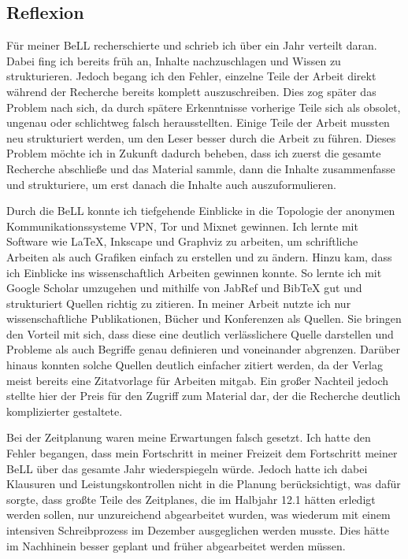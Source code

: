 \subsection{Reflexion}

Für meiner BeLL recherschierte und schrieb ich über ein Jahr verteilt daran. Dabei fing ich bereits früh an, Inhalte nachzuschlagen und Wissen zu strukturieren. Jedoch begang ich den Fehler, einzelne Teile der Arbeit direkt während der Recherche bereits komplett auszuschreiben. Dies zog später das Problem nach sich, da durch spätere Erkenntnisse vorherige Teile sich als obsolet, ungenau oder schlichtweg falsch herausstellten. Einige Teile der Arbeit mussten neu strukturiert werden, um den Leser besser durch die Arbeit zu führen. Dieses Problem möchte ich in Zukunft dadurch beheben, dass ich zuerst die gesamte Recherche abschließe und das Material sammle, dann die Inhalte zusammenfasse und strukturiere, um erst danach die Inhalte auch auszuformulieren.

Durch die BeLL konnte ich tiefgehende Einblicke in die Topologie der anonymen Kommunikationssysteme VPN, Tor und Mixnet gewinnen.
Ich lernte mit Software wie LaTeX, Inkscape und Graphviz zu arbeiten, um schriftliche Arbeiten als auch Grafiken einfach zu erstellen und zu ändern. Hinzu kam, dass ich Einblicke ins wissenschaftlich Arbeiten gewinnen konnte. So lernte ich mit Google Scholar umzugehen und mithilfe von JabRef und BibTeX gut und strukturiert Quellen richtig zu zitieren.
In meiner Arbeit nutzte ich nur wissenschaftliche Publikationen, Bücher und Konferenzen als Quellen. Sie bringen den Vorteil mit sich, dass diese eine deutlich verlässlichere Quelle darstellen und Probleme als auch Begriffe genau definieren und voneinander abgrenzen. Darüber hinaus konnten solche Quellen deutlich einfacher zitiert werden, da der Verlag meist bereits eine Zitatvorlage für Arbeiten mitgab. Ein großer Nachteil jedoch stellte hier der Preis für den Zugriff zum Material dar, der die Recherche deutlich komplizierter gestaltete.

Bei der Zeitplanung waren meine Erwartungen falsch gesetzt. Ich hatte den Fehler begangen, dass mein Fortschritt in meiner Freizeit dem Fortschritt meiner BeLL über das gesamte Jahr wiederspiegeln würde. Jedoch hatte ich dabei Klausuren und Leistungskontrollen nicht in die Planung berücksichtigt, was dafür sorgte, dass großte Teile des Zeitplanes, die im Halbjahr 12.1 hätten erledigt werden sollen, nur unzureichend abgearbeitet wurden, was wiederum mit einem intensiven Schreibprozess im Dezember ausgeglichen werden musste. Dies hätte im Nachhinein besser geplant und früher abgearbeitet werden müssen.

